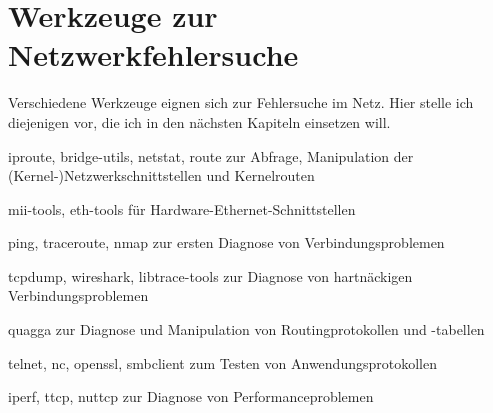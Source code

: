 \chapter{Werkzeuge zur Netzwerkfehlersuche}
\label{cha:netz-werkzeuge}

\begin{abstractsec}
  Verschiedene Werkzeuge eignen sich zur Fehlersuche im Netz. Hier stelle ich
  diejenigen vor, die ich in den nächsten Kapiteln einsetzen will.
\end{abstractsec}

\begin{notes}
\item[iproute, bridge-utils, netstat, route] zur Abfrage,
  Manipulation der (Kernel-)Netzwerkschnittstellen und Kernelrouten
\item[mii-tools, eth-tools] für Hardware-Ethernet-Schnittstellen
\item[ping, traceroute, nmap] zur ersten Diagnose von Verbindungsproblemen
\item[tcpdump, wireshark, libtrace-tools] zur Diagnose von hartnäckigen
  Verbindungsproblemen
\item[quagga] zur Diagnose und Manipulation von Routingprotokollen und
  -tabellen
\item[telnet, nc, openssl, smbclient] zum Testen von Anwendungsprotokollen
\item[iperf, ttcp, nuttcp] zur Diagnose von Performanceproblemen
\end{notes}

